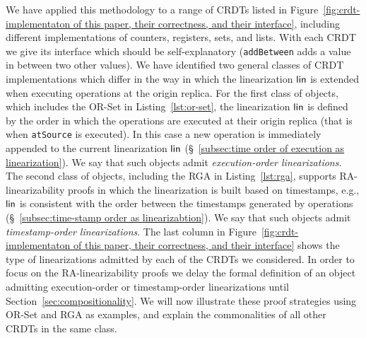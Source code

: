 We have applied this methodology to a range of CRDTs listed in Figure~\ref{fig:crdt-implementaton of this paper, their correctness, and their interface},
including different implementations of counters, registers, sets, and lists. With each CRDT we give its interface which should be self-explanatory
({\tt addBetween} adds a value in between two other values).
We have identified two general classes of
CRDT implementations which differ in the way in which the
linearization $\mathsf{lin}$ is extended when executing operations at
the origin replica.
For the first class of objects, which includes the OR-Set in
Listing~\ref{lst:or-set}, the linearization $\mathsf{lin}$ is defined by
the order in which the operations are executed at their origin replica (that is
when \lstinline|atSource| is executed).
In this case a new operation is immediately appended
to the current linearization $\mathsf{lin}$ (\S~\ref{subsec:time order of execution
  as linearization}).
We say that such objects admit \emph{execution-order linearizations}.
The second class of objects, including the RGA in
Listing~\ref{lst:rga}, supports RA-linearizability proofs in which the
linearization is built based on timestamps, e.g., $\mathsf{lin}$ is
consistent with the order between the timestamps generated by
operations (\S~\ref{subsec:time-stamp order as linearizabtion}).
We say that such objects admit \emph{timestamp-order linearizations}.
The last column in Figure~\ref{fig:crdt-implementaton of this paper, their correctness, and their interface}
shows the type of linearizations admitted by each of the CRDTs we considered. 
In order to focus on the RA-linearizability proofs we delay the formal definition 
of an object admitting execution-order or timestamp-order linearizations until Section~\ref{sec:compositionality}.
We will now illustrate these proof strategies using OR-Set and RGA as examples,
%
and explain the commonalities of all other CRDTs in
the same class.

